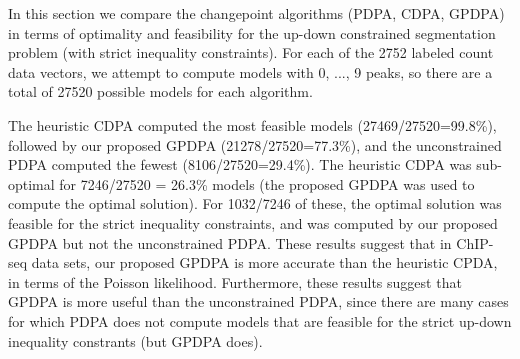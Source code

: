 \documentclass[twoside,11pt]{article}
\begin{document}
In this section we compare the changepoint algorithms (PDPA, CDPA,
GPDPA) in terms of optimality and feasibility for the up-down
constrained segmentation problem (with strict inequality constraints).
For each of the 2752 labeled count data vectors, we attempt to compute
models with 0, ..., 9 peaks, so there are a total of 27520 possible
models for each algorithm.

The heuristic CDPA computed the most feasible models
(27469/27520=99.8\%), followed by our proposed GPDPA
(21278/27520=77.3\%), and the unconstrained PDPA computed the fewest
(8106/27520=29.4\%). The heuristic CDPA was sub-optimal for 7246/27520 = 26.3\%
models (the proposed GPDPA was used to compute the optimal solution). 
For 1032/7246 of these, the optimal solution was feasible for the
strict inequality constraints, and was computed by our proposed GPDPA
but not the unconstrained PDPA. 
These results suggest that in ChIP-seq data
sets, our proposed GPDPA is more accurate than the heuristic CPDA, in terms of the Poisson likelihood. 
Furthermore, these results suggest
that GPDPA is more useful than the unconstrained PDPA, since there are
many cases for which PDPA does not compute models that are feasible
for the strict up-down inequality constrants (but GPDPA does).



\end{document}
